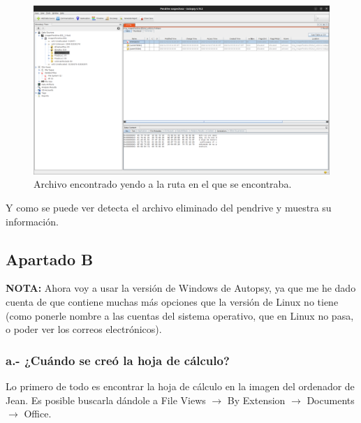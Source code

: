\documentclass{article}
\begin{document}
\begin{figure}[H]
    \centering
    \includegraphics[width=\textwidth]{imagenes/Captura desde 2022-12-03 21-53-51.png}
    \caption{Archivo encontrado yendo a la ruta en el que se encontraba.}
\end{figure}

Y como se puede ver detecta el archivo eliminado del pendrive y muestra su información.

\newpage

{}
\subsection*{Apartado B}

\textbf{NOTA: }Ahora voy a usar la versión de Windows de Autopsy, ya que me he dado cuenta de que contiene muchas más opciones que la versión de Linux no tiene (como ponerle nombre a las cuentas del sistema operativo, que en Linux no pasa, o poder ver los correos electrónicos).

{}
\subsubsection*{a.- ¿Cuándo se creó la hoja de cálculo?}

Lo primero de todo es encontrar la hoja de cálculo en la imagen del ordenador de Jean. Es posible buscarla dándole a File Views $\rightarrow$ By Extension $\rightarrow$ Documents $\rightarrow$ Office.
\end{document}
